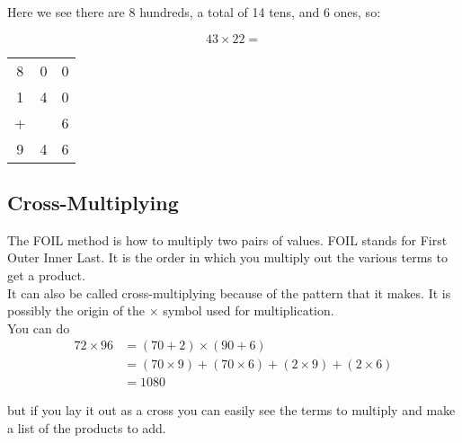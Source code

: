 \documentclass{article}
\begin{document}
\begin{spacing}{1.25}
Here we see there are 8 hundreds, a total of 14 tens, and 6 ones, so:

$$43 \times 22 = $$

\begin{center}
\begin{tabular}{c@{\,}c@{\,}c}
	8&0&0\\
    1&4&0\\
   + & &6\\
	\hline
	9&4&6\\
	\hline
	\hline
\end{tabular}
\end{center}

\pagebreak

\subsection*{Cross-Multiplying}

The FOIL method is how to multiply two pairs of values. FOIL stands for First Outer Inner Last. It is the order in which you multiply out the various terms to get a product.\\

It can also be called cross-multiplying because of the pattern that it makes. It is possibly the origin of the $\times$ symbol used for multiplication.\\

You can do
\begin{align*}
72 \times 96 &= (70 + 2) \times (90 + 6)\\
             &= (70 \times 9) + (70 \times 6) + (2 \times 9) + (2 \times 6)\\
             &=1080
\end{align*}

but if you lay it out as a cross you can easily see the terms to multiply and make a list of the products to add.\\


\end{spacing}
\end{document}
